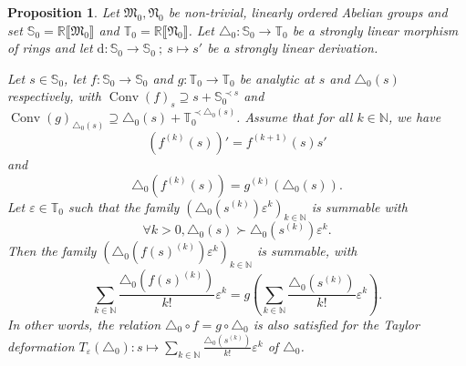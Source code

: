 \documentclass{article}
\newcommand{\mathd}{\mathrm{d}}
\newcommand{\of}{:}
\newcommand{\tmop}[1]{\ensuremath{\operatorname{#1}}}
\newtheorem{proposition}[theorem]{Proposition}
\theoremstyle{remark}\newtheorem*{convention*}{Convention}
\begin{document}
\begin{proposition}
  \label{prop-Taylor-expansion-hyperlog}Let $\mathfrak{M}_0, \mathfrak{N}_0$
  be non-trivial, linearly ordered Abelian groups and set $\mathbb{S}_0
  =\mathbb{R} \llbracket \mathfrak{M}_0 \rrbracket$ and $\mathbb{T}_0
  =\mathbb{R} \llbracket \mathfrak{N}_0 \rrbracket$. Let $\triangle_0 \of
  \mathbb{S}_0 \longrightarrow \mathbb{T}_0$ be a strongly linear morphism of
  rings and let $\mathd \of \mathbb{S}_0 \longrightarrow \mathbb{S}_0 \: ; \:
  s \mapsto s'$ be a strongly linear derivation.
  
  Let $s \in \mathbb{S}_0$, let $f \of \mathbb{S}_0 \longrightarrow
  \mathbb{S}_0$ and $g \of \mathbb{T}_0 \longrightarrow \mathbb{T}_0$ be
  analytic at $s$ and $\triangle_0 (s)$ respectively, with $\tmop{Conv} (f)_s
  \supseteq s +\mathbb{S}_0^{\prec s}$ and $\tmop{Conv} (g)_{\triangle_0 (s)}
  \supseteq \triangle_0 (s) +\mathbb{T}_0^{\prec \triangle_0 (s)}$. Assume
  that for all $k \in \mathbb{N}$, we have
  \begin{equation}
    (f^{(k)} (s))' = f^{(k + 1)} (s) s' \label{eq-chain-rule-abstract}
  \end{equation}
  and
  \begin{equation}
    \triangle_0 (f^{(k)} (s)) = g^{(k)} (\triangle_0 (s))
    \label{eq-cond-prop-hyperlog-Taylor-comp} .
  \end{equation}
  Let $\varepsilon \in \mathbb{T}_0$ such that the family $(\triangle_0
  (s^{(k)}) \varepsilon^k)_{k \in \mathbb{N}}$ is summable with
  \begin{equation}
    \forall k > 0, \triangle_0 (s) \succ \triangle_0 (s^{(k)}) \varepsilon^k .
    \label{eq-cond2-prop-hyperlog-Taylor-comp}
  \end{equation}
  Then the family $(\triangle_0 (f (s)^{(k)}) \varepsilon^k)_{k \in
  \mathbb{N}}$ is summable, with
  \[ \sum_{k \in \mathbb{N}} \frac{\triangle_0 (f (s)^{(k)})}{k!}
     \varepsilon^k = g \left( \sum_{k \in \mathbb{N}} \frac{\triangle_0
     (s^{(k)})}{k!} \varepsilon^k \right) . \]
  In other words, the relation $\triangle_0 \circ f = g \circ \triangle_0$ is
  also satisfied for the Taylor deformation $T_{\varepsilon} (\triangle_0) \of
  s \mapsto \sum_{k \in \mathbb{N}} \frac{\triangle_0 (s^{(k)})}{k!}
  \varepsilon^k$ of $\triangle_0$.
\end{proposition}
\end{document}
